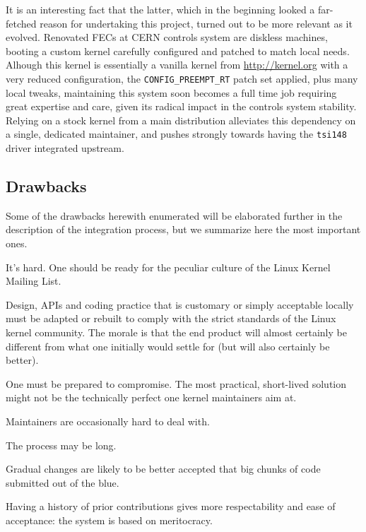 \documentclass{JAC2003}
\begin{document}
It is an interesting fact that the latter, which in the beginning looked
a far-fetched reason for undertaking this project, turned out to be more
relevant as it evolved. Renovated FECs at CERN controls system are
diskless machines, booting a custom kernel carefully configured and
patched to match local needs. Alhough this kernel is essentially a
vanilla kernel from \url{http://kernel.org} with a very reduced
configuration, the \verb|CONFIG_PREEMPT_RT|
patch set applied, plus many local tweaks,
maintaining this system soon becomes a full time job requiring
great expertise and care, given its radical impact in the controls
system stability. Relying on a stock kernel from a main
distribution alleviates this dependency on a single, dedicated
maintainer, and pushes strongly towards having the \texttt{tsi148}
driver integrated upstream.

\subsection{Drawbacks}

Some of the drawbacks herewith enumerated will be elaborated further in
the description of the integration process, but we summarize here the
most important ones.

\begin{Itemize}
\item It's hard. One should be ready for the peculiar culture of the
    Linux Kernel Mailing List.
\item Design, APIs and coding practice that is customary or simply
    acceptable locally must be adapted or rebuilt to comply with the
    strict standards of the Linux kernel community. The morale
    is that the end product will almost certainly be different from what one
    initially would settle for (but will also certainly be better).
\item One must be prepared to compromise. The most practical,
    short-lived solution might not be the technically perfect one kernel
    maintainers aim at.
\item Maintainers are occasionally hard to deal with.
\item The process may be long.
\item Gradual changes are likely to be better accepted that big chunks
    of code submitted out of the blue.
\item Having a history of prior contributions gives more respectability
    and ease of acceptance: the system is based on meritocracy.
\end{Itemize}
\end{document}
